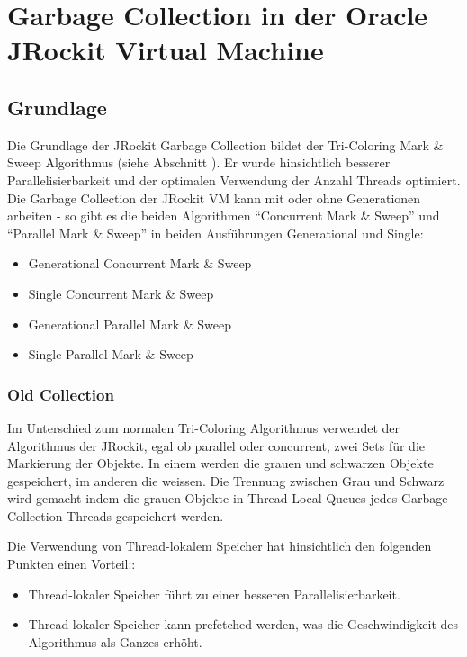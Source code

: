 \chapter{Garbage Collection in der Oracle JRockit Virtual Machine}\label{jrockit garbage collection}
\section{Grundlage}
Die Grundlage der JRockit Garbage Collection bildet der Tri-Coloring Mark \& Sweep Algorithmus (siehe Abschnitt ). Er wurde hinsichtlich besserer Parallelisierbarkeit und der optimalen Verwendung der Anzahl Threads optimiert. Die Garbage Collection der JRockit VM kann mit oder ohne Generationen arbeiten - so gibt es die beiden Algorithmen ``Concurrent Mark \& Sweep'' und ``Parallel Mark \& Sweep'' in beiden Ausführungen Generational und Single:

\begin{itemize}
	\item Generational Concurrent Mark \& Sweep
	\item Single Concurrent Mark \& Sweep
	\item Generational Parallel Mark \& Sweep	
	\item Single Parallel Mark \& Sweep
\end{itemize}

\subsection{Old Collection}
Im Unterschied zum normalen Tri-Coloring Algorithmus verwendet der Algorithmus der JRockit, egal ob parallel oder concurrent, zwei Sets für die Markierung der Objekte. In einem werden die grauen und schwarzen Objekte gespeichert, im anderen die weissen. Die Trennung zwischen Grau und Schwarz wird gemacht indem die grauen Objekte in Thread-Local Queues jedes Garbage Collection Threads gespeichert werden. 

Die Verwendung von Thread-lokalem Speicher hat hinsichtlich den folgenden Punkten einen Vorteil:\cite[S. 79]{lagergren2010oracle}:
\begin{itemize}
	\item Thread-lokaler Speicher führt zu einer besseren Parallelisierbarkeit.
	\item Thread-lokaler Speicher kann prefetched werden, was die Geschwindigkeit des Algorithmus als Ganzes erhöht.
\end{itemize}

